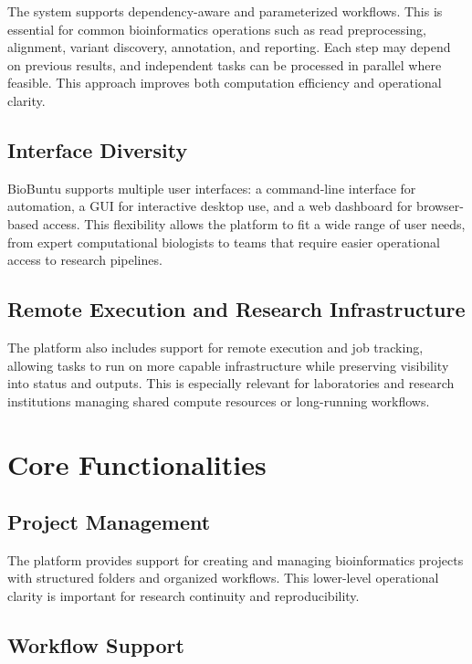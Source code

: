 \documentclass[10pt,conference]{IEEEtran}
\begin{document}
The system supports dependency-aware and parameterized workflows. This is essential for common bioinformatics operations such as read preprocessing, alignment, variant discovery, annotation, and reporting. Each step may depend on previous results, and independent tasks can be processed in parallel where feasible. This approach improves both computation efficiency and operational clarity.

\subsection{Interface Diversity}

BioBuntu supports multiple user interfaces: a command-line interface for automation, a GUI for interactive desktop use, and a web dashboard for browser-based access. This flexibility allows the platform to fit a wide range of user needs, from expert computational biologists to teams that require easier operational access to research pipelines.

\subsection{Remote Execution and Research Infrastructure}

The platform also includes support for remote execution and job tracking, allowing tasks to run on more capable infrastructure while preserving visibility into status and outputs. This is especially relevant for laboratories and research institutions managing shared compute resources or long-running workflows.

\section{Core Functionalities}

\subsection{Project Management}

The platform provides support for creating and managing bioinformatics projects with structured folders and organized workflows. This lower-level operational clarity is important for research continuity and reproducibility.

\subsection{Workflow Support}
\end{document}
